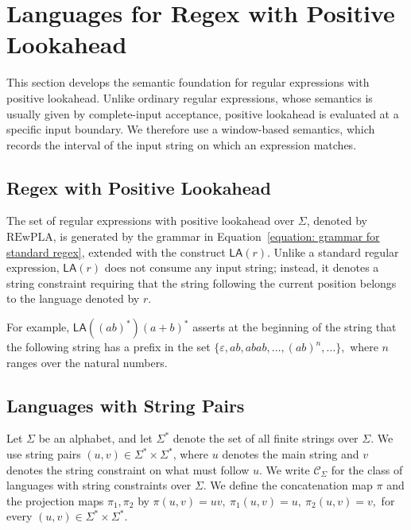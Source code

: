 \section{Languages for Regex with Positive Lookahead}
\label{sec:lookahead-semantics}

This section develops the semantic foundation for regular expressions
with positive lookahead. Unlike ordinary regular expressions, whose
semantics is usually given by complete-input acceptance, positive
lookahead is evaluated at a specific input boundary. We therefore use a
window-based semantics, which records the interval of the input string on
which an expression matches.

\subsection{Regex with Positive Lookahead}

The set of regular expressions with positive lookahead over $\Sigma$, denoted by $\mathrm{REwPLA}$, is generated by the grammar in Equation~\ref{equation: grammar for standard regex}, extended with the construct $\mathsf{LA}(r)$. Unlike a standard regular expression, $\mathsf{LA}(r)$ does not consume any input string; instead, it denotes a string constraint requiring that the string following the current position belongs to the language denoted by $r$.

For example, $\mathsf{LA}((ab)^*)(a+ b)^*$ asserts at the beginning of the string that the following string has a prefix in the set $
\{\varepsilon,ab,abab,\ldots,(ab)^n,\ldots\},
$
where $n$ ranges over the natural numbers.

\subsection{Languages with String Pairs}
\label{sec:languages-with-prefix-contexts}


Let $\Sigma$ be an alphabet, and let $\Sigma^*$ denote the set of all finite strings over $\Sigma$. We use string pairs $(u,v)\in\Sigma^*\times\Sigma^*$, where $u$ denotes the main string and $v$ denotes the string constraint on what must follow $u$. We write $\mathcal{C}_{\Sigma}$ for the class of languages with string constraints over $\Sigma$. We define the concatenation map $\pi$ and the projection maps
$\pi_1,\pi_2$ by
$
\pi(u,v)=uv,
\:
\pi_1(u,v)=u,
\:
\pi_2(u,v)=v,
$
for every $(u,v)\in\Sigma^*\times\Sigma^*$.

